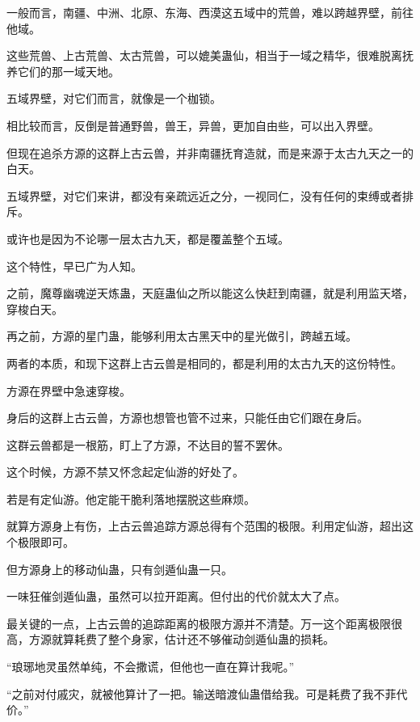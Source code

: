 
\begin{this_body}



一般而言，南疆、中洲、北原、东海、西漠这五域中的荒兽，难以跨越界壁，前往他域。

这些荒兽、上古荒兽、太古荒兽，可以媲美蛊仙，相当于一域之精华，很难脱离抚养它们的那一域天地。

五域界壁，对它们而言，就像是一个枷锁。

相比较而言，反倒是普通野兽，兽王，异兽，更加自由些，可以出入界壁。

但现在追杀方源的这群上古云兽，并非南疆抚育造就，而是来源于太古九天之一的白天。

五域界壁，对它们来讲，都没有亲疏远近之分，一视同仁，没有任何的束缚或者排斥。

或许也是因为不论哪一层太古九天，都是覆盖整个五域。

这个特性，早已广为人知。

之前，魔尊幽魂逆天炼蛊，天庭蛊仙之所以能这么快赶到南疆，就是利用监天塔，穿梭白天。

再之前，方源的星门蛊，能够利用太古黑天中的星光做引，跨越五域。

两者的本质，和现下这群上古云兽是相同的，都是利用的太古九天的这份特性。

方源在界壁中急速穿梭。

身后的这群上古云兽，方源也想管也管不过来，只能任由它们跟在身后。

这群云兽都是一根筋，盯上了方源，不达目的誓不罢休。

这个时候，方源不禁又怀念起定仙游的好处了。

若是有定仙游。他定能干脆利落地摆脱这些麻烦。

就算方源身上有伤，上古云兽追踪方源总得有个范围的极限。利用定仙游，超出这个极限即可。

但方源身上的移动仙蛊，只有剑遁仙蛊一只。

一味狂催剑遁仙蛊，虽然可以拉开距离。但付出的代价就太大了点。

最关键的一点，上古云兽的追踪距离的极限方源并不清楚。万一这个距离极限很高，方源就算耗费了整个身家，估计还不够催动剑遁仙蛊的损耗。

“琅琊地灵虽然单纯，不会撒谎，但他也一直在算计我呢。”

“之前对付戚灾，就被他算计了一把。输送暗渡仙蛊借给我。可是耗费了我不菲代价。”


\end{this_body}
